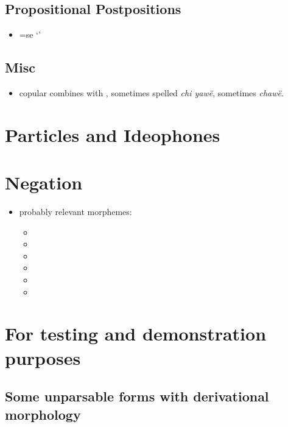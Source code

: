\documentclass{memoir}
\begin{document}
\section{Propositional Postpositions}

\begin{itemize}
\tightlist
\item
  =se `'
\end{itemize}

\section{Misc}

\begin{itemize}
\tightlist
\item
  copular  combines with , sometimes spelled
  \emph{chi yawë}, sometimes \emph{chawë}.
\end{itemize}

\chapter{\texorpdfstring{Particles and Ideophones
\label{partideo}}{Particles and Ideophones }}

\chapter{\texorpdfstring{Negation \label{negation}}{Negation }}

\begin{itemize}
\tightlist
\item
  probably relevant morphemes:

  \begin{itemize}
  \item
  \item
  \item
  \item
  \item
  \item
  \end{itemize}
\end{itemize}

\chapter{For testing and demonstration purposes}

\section{Some unparsable forms with derivational morphology}
\end{document}
